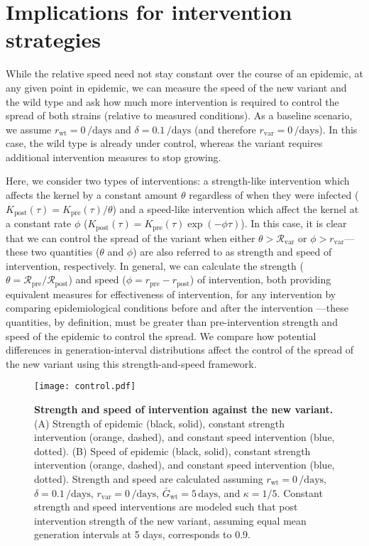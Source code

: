\documentclass[12pt]{article}
\newcommand{\rx}[1]{\ensuremath{{r}_{#1}}\xspace}
\newcommand{\ry}[1]{\rx{\mathrm{#1}}}
\newcommand{\Rx}[1]{\ensuremath{{\mathcal R}_{#1}}\xspace}
\newcommand{\Ry}[1]{\Rx{\mathrm{#1}}}
\newcommand{\Gx}[1]{\ensuremath{{\bar G}_{#1}}\xspace}
\newcommand{\Gy}[1]{\Gx{\mathrm{#1}}}
\begin{document}
\section{Implications for intervention strategies}

While the relative speed need not stay constant over the course of an epidemic, at any given point in epidemic, we can measure the speed of the new variant and the wild type and ask how much more intervention is required to control the spread of both strains (relative to measured conditions).
As a baseline scenario, we assume $\ry{wt}=0\,\textrm{/days}$ and $\delta=0.1\,\textrm{/days}$ (and therefore $\ry{var}=0\,\textrm{/days}$).
In this case, the wild type is already under control, whereas the variant requires additional intervention measures to stop growing.

Here, we consider two types of interventions:
a strength-like intervention which affects the kernel by a constant amount $\theta$ regardless of when they were infected ($K_{\mathrm{post}}(\tau) = K_{\mathrm{pre}}(\tau)/\theta$) and a speed-like intervention which affect the kernel at a constant rate $\phi$ ($K_{\mathrm{post}}(\tau) = K_{\mathrm{pre}}(\tau) \exp(-\phi \tau)$).
In this case, it is clear that we can control the spread of the variant when either $\theta > \Ry{var}$ or $\phi > \ry{var}$---these two quantities ($\theta$ and $\phi$) are also referred to as strength and speed of intervention, respectively.
In general, we can calculate the strength ($\theta = \Ry{pre}/\Ry{post}$) and speed ($\phi = \ry{pre} - \ry{post}$) of intervention, both providing equivalent measures for effectiveness of intervention, for any intervention by comparing epidemiological conditions before and after the intervention \citep{doi:10.1098/rspb.2020.1556}---these quantities, by definition, must be greater than pre-intervention strength and speed of the epidemic to control the spread.
We compare how potential differences in generation-interval distributions affect the control of the spread of the new variant using this strength-and-speed framework.

\begin{figure}[!th]
\texttt{[image: control.pdf]}
\caption{
\textbf{Strength and speed of intervention against the new variant.}
(A) Strength of epidemic (black, solid), constant strength intervention (orange, dashed), and constant speed intervention (blue, dotted).
(B) Speed of epidemic (black, solid), constant strength intervention (orange, dashed), and constant speed intervention (blue, dotted).
Strength and speed are calculated assuming $\ry{wt}=0\,\textrm{/days}$, $\delta=0.1\,\textrm{/days}$, $\ry{var}=0\,\textrm{/days}$, $\Gy{wt}=5\,\textrm{days}$, and $\kappa=1/5$.
Constant strength and speed interventions are modeled such that post intervention strength of the new variant, assuming equal mean generation intervals at 5 days, corresponds to 0.9.
}
\label{fig:strengthspeed}
\end{figure}
\end{document}
